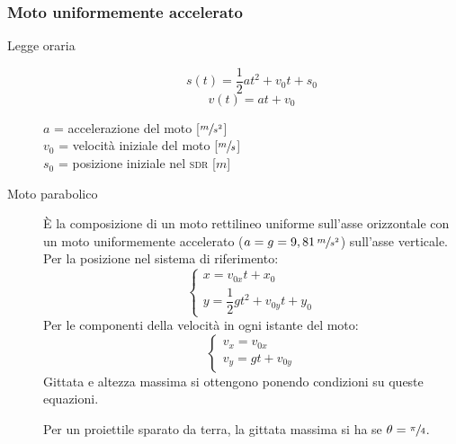 \documentclass[a4paper,11pt,italian]{article}
\begin{document}
\subsubsection{Moto uniformemente accelerato}
\begin{description}
  \item[Legge oraria] 
  \[ s(t) = \frac{1}{2} a t^2 + v_0 t + s_0 \] 
  \[ v(t) = at + v_0 \]
  \begin{multicols}{2}
  $ a $ = accelerazione del moto [$ \sfrac{m}{s^2} $]\\
  $ v_0 $ = velocità iniziale del moto [$ \sfrac{m}{s} $]\\
  $ s_0 $ = posizione iniziale nel \textsc{sdr} [$ m $]
  \end{multicols}
  
  \item[Moto parabolico] 
  È la composizione di un moto rettilineo uniforme sull'asse orizzontale con un moto uniformemente accelerato ($ a=g=9,81 \, \sfrac{m}{s^2} $) sull'asse verticale. Per la posizione nel sistema di riferimento:
  \[
  \left\{ 
  \begin{array}{l}
  x = v_{0x}t + x_0 \\ 
  y = \dfrac{1}{2}gt^2 + v_{0y}t + y_0
  \end{array}
  \right.
  \]
Per le componenti della velocità in ogni istante del moto:
  \[
  \left\{ 
  \begin{array}{l}
  v_x = v_{0x} \\ 
  v_y = gt + v_{0y}
  \end{array}
  \right.
  \]
Gittata e altezza massima si ottengono ponendo condizioni su queste equazioni.

Per un proiettile sparato da terra, la gittata massima si ha se $ \theta = \sfrac{\pi}{4} $.

\end{description}
\end{document}
